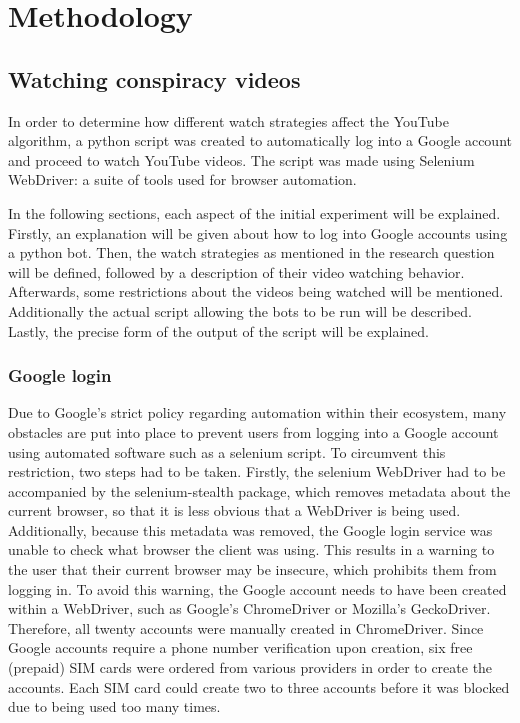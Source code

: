 \documentclass[../main.tex]{subfiles}
\begin{document}
\section{Methodology}
\subsection{Watching conspiracy videos}
In order to determine how different watch strategies affect the YouTube algorithm, a python script was
created to automatically log into a Google account and proceed to watch YouTube videos. The script was
made using Selenium WebDriver: a suite of tools used for browser automation. 

In the following sections, each aspect of the initial experiment will be explained. Firstly, an explanation
will be given about how to log into Google accounts using a python bot. Then, the watch strategies as
mentioned in the research question will be defined, followed by a description of their video watching 
behavior. Afterwards, some restrictions about the videos being watched will be mentioned. Additionally the
actual script allowing the bots to be run will be described. Lastly, the precise form of the output of the script will be explained. 

\subsubsection{Google login}
Due to Google's strict policy regarding automation within their ecosystem, many obstacles are put into
place to prevent users from logging into a Google account using automated software such as a selenium 
script. To circumvent this restriction, two steps had to be taken. Firstly, the selenium WebDriver had to
be accompanied by the selenium-stealth package, which removes metadata about the current browser, so that
it is less obvious that a WebDriver is being used. Additionally, because this metadata was removed, the 
Google login service was unable to check what browser the client was using. This results in a warning to 
the user that their current browser may be insecure, which prohibits them from logging in. To avoid this 
warning, the Google account needs to have been created within a WebDriver, such as Google's ChromeDriver 
or Mozilla's GeckoDriver. Therefore, all twenty accounts were manually created in ChromeDriver. Since 
Google accounts require a phone number verification upon creation, six free (prepaid) SIM cards were 
ordered from various providers in order to create the accounts. Each SIM card could create two to three 
accounts before it was blocked due to being used too many times. 
\end{document}
